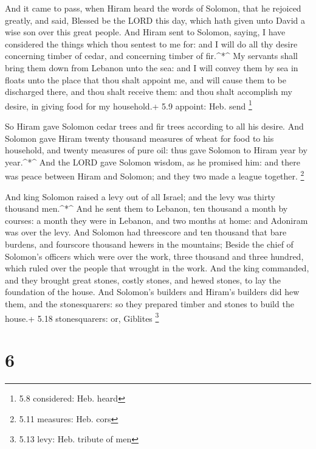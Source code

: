  And it came to pass, when Hiram heard the words of Solomon,
that he rejoiced greatly, and said, Blessed be the LORD this day, which
hath given unto David a wise son over this great people. 
And Hiram sent to Solomon, saying, I have considered the things which
thou sentest to me for: and I will do all thy desire concerning timber
of cedar, and concerning timber of fir.\^{}*\^{}  My
servants shall bring them down from Lebanon unto the sea: and I will
convey them by sea in floats unto the place that thou shalt appoint me,
and will cause them to be discharged there, and thou shalt receive them:
and thou shalt accomplish my desire, in giving food for my household.+
5.9 appoint: Heb. send \footnote{5.8 considered: Heb. heard}

 So Hiram gave Solomon cedar trees and fir trees according
to all his desire.  And Solomon gave Hiram twenty thousand
measures of wheat for food to his household, and twenty measures of pure
oil: thus gave Solomon to Hiram year by year.\^{}*\^{}  And
the LORD gave Solomon wisdom, as he promised him: and there was peace
between Hiram and Solomon; and they two made a league together.
\footnote{5.11 measures: Heb. cors}

 And king Solomon raised a levy out of all Israel; and the
levy was thirty thousand men.\^{}*\^{}  And he sent them to
Lebanon, ten thousand a month by courses: a month they were in Lebanon,
and two months at home: and Adoniram was over the levy. 
And Solomon had threescore and ten thousand that bare burdens, and
fourscore thousand hewers in the mountains;  Beside the
chief of Solomon's officers which were over the work, three thousand and
three hundred, which ruled over the people that wrought in the work.
 And the king commanded, and they brought great stones,
costly stones, and hewed stones, to lay the foundation of the house.
 And Solomon's builders and Hiram's builders did hew them,
and the stonesquarers: so they prepared timber and stones to build the
house.+ 5.18 stonesquarers: or, Giblites \footnote{5.13 levy: Heb.
  tribute of men}

\hypertarget{section-5}{%
\section{6}\label{section-5}}

